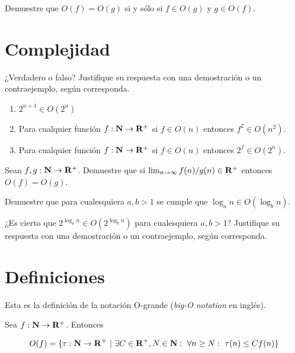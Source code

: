 \documentclass{amsart}
\begin{document}
\begin{ejer*}
	Demuestre que $O(f) = O(g)$ si y sólo si $f \in O(g)$ y $g \in O(f)$.
\end{ejer*}

\section{Complejidad}

\begin{ejer}
	¿Verdadero o falso? Justifique su respuesta con una demostración o un
	contraejemplo, según corresponda.

	\begin{enumerate}
		\item $2^{n+1} \in O(2^n)$
		\item Para cualquier función $f : \mathbf{N} \to \mathbf{R}^{+}$ si $f \in O(n)$
			entonces $f^2 \in O(n^2)$.
		\item Para cualquier función $f : \mathbf{N} \to \mathbf{R}^{+}$ si $f \in O(n)$
			entonces $2^f \in O(2^n)$.
	\end{enumerate}
\end{ejer}

\begin{ejer}
	Sean $f, g : \mathbf{N} \to \mathbf{R}^{+}$. Demuestre que si $\lim_{n \to \infty} f(n)/g(n) \in \mathbf{R}^{+}$ entonces $O(f) = O(g)$.
\end{ejer}

\begin{ejer}
	Demuestre que para cualesquiera $a, b > 1$ se cumple que $\log_a n \in O(\log_b n)$.
\end{ejer}

\begin{ejer}
	¿Es cierto que $2^{\log_a n} \in O(2^{\log_b n})$ para cualesquiera $a, b > 1$? Justifique su respuesta con una demostración o un contraejemplo, según corresponda.
\end{ejer}

\newpage
\thispagestyle{plain}

\section*{Definiciones}

Esta es la definición de la notación O-grande (\emph{big-O notation} en inglés).

\begin{defn}
	Sea $f : \mathbf{N} \to \mathbf{R}^{+}$. Entonces

	$$
	O(f) = \{\tau : \NN \to \Rpos \ | \ \exists C \in \Rpos, N \in \NN:
	\ \forall n \geq N: \ \tau(n) \leq C f(n)\}
	$$
\end{defn}
\end{document}
